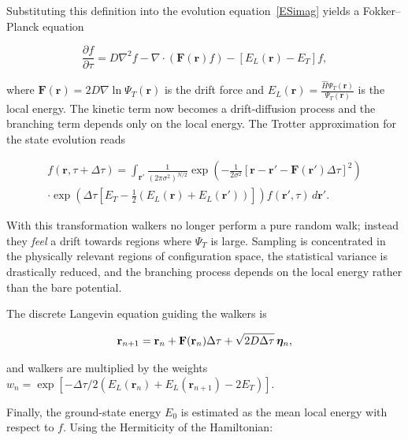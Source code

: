 \documentclass[11pt,a4paper,twoside,pdf]{article}
\numberwithin{equation}{section}
\begin{document}
Substituting this definition into the evolution equation~\ref{ESimag} yields a
Fokker–Planck equation

\begin{equation}
\frac{\partial f}{\partial \tau}
=
D \nabla^2 f
-
\nabla \cdot \left( \mathbf F(\mathbf r) f \right)
-
\left[E_L(\mathbf r)-E_T\right] f,
\end{equation}

where $\mathbf F(\mathbf r) = 2D \nabla \ln \Psi_T(\mathbf r)$ is the drift force
and $E_L(\mathbf r) = \frac{\hat H \Psi_T(\mathbf r)}{\Psi_T(\mathbf r)}$ is the
local energy. The kinetic term now becomes a drift-diffusion process and the
branching term depends only on the local energy. The Trotter approximation for the
state evolution reads

\begin{equation}
\begin{split}
    f(\mathbf{r}, \tau + \Delta \tau) = \int_{\mathbf{r'}} \frac{1}{(2\pi \sigma^2)^{N/2}} \exp \left( -\frac{1}{2\sigma^2} \left[ \mathbf{r} - \mathbf{r'} -\mathbf{F}(\mathbf{r'}) \Delta \tau \right]^2 \right) \\
    \cdot \exp \left( \Delta \tau \left[ E_T - \frac{1}{2}( E_L(\mathbf{r}) + E_L(\mathbf{r'})) \right] \right) f(\mathbf{r'}, \tau) \,d\mathbf{r'}.
\end{split}
\end{equation}

With this transformation walkers no longer perform a pure random walk; instead
they \textit{feel} a drift towards regions where $\Psi_T$ is large. Sampling is
concentrated in the physically relevant regions of configuration space, the
statistical variance is drastically reduced, and the branching process depends
on the local energy rather than the bare potential.

The discrete Langevin equation guiding the walkers is

\begin{equation}
\mathbf r_{n+1}
=
\mathbf r_n
+
\mathbf F(\mathbf r_n)\Delta\tau
+
\sqrt{2D\Delta\tau}\,\boldsymbol\eta_n,
\notag
\end{equation}

and walkers are multiplied by the weights
$w_n = \exp\left[-\Delta\tau / 2 \left(E_L(\mathbf r_{n}) + E_L(\mathbf r_{n+1}) - 2E_T\right)\right]$.

Finally, the ground-state energy $E_0$ is estimated as the mean local energy
with respect to $f$. Using the Hermiticity of the Hamiltonian:
\end{document}
